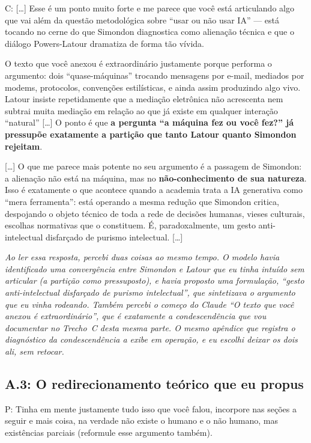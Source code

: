 \begin{faladaC}
C: [\ldots] Esse é um ponto muito forte e me parece que você está articulando algo que vai além da questão metodológica sobre ``usar ou não usar IA'' --- está tocando no cerne do que Simondon diagnostica como alienação técnica e que o diálogo Powers-Latour dramatiza de forma tão vívida.

O texto que você anexou é extraordinário justamente porque performa o argumento: dois ``quase-máquinas'' trocando mensagens por e-mail, mediados por modems, protocolos, convenções estilísticas, e ainda assim produzindo algo vivo. Latour insiste repetidamente que a mediação eletrônica não acrescenta nem subtrai muita mediação em relação ao que já existe em qualquer interação ``natural'' [\ldots] O ponto é que \textbf{a pergunta ``a máquina fez ou você fez?'' já pressupõe exatamente a partição que tanto Latour quanto Simondon rejeitam}.

[\ldots] O que me parece mais potente no seu argumento é a passagem de Simondon: a alienação não está na máquina, mas no \textbf{não-conhecimento de sua natureza}. Isso é exatamente o que acontece quando a academia trata a IA generativa como ``mera ferramenta'': está operando a mesma redução que Simondon critica, despojando o objeto técnico de toda a rede de decisões humanas, vieses culturais, escolhas normativas que o constituem. É, paradoxalmente, um gesto anti-intelectual disfarçado de purismo intelectual. [\ldots]
\end{faladaC}

\noindent\emph{Ao ler essa resposta, percebi duas coisas ao mesmo tempo. O modelo havia identificado uma convergência entre Simondon e Latour que eu tinha intuído sem articular (a partição como pressuposto), e havia proposto uma formulação, ``gesto anti-intelectual disfarçado de purismo intelectual'', que sintetizava o argumento que eu vinha rodeando. Também percebi o começo do Claude ``O texto que você anexou é extraordinário'', que é exatamente a condescendência que vou documentar no Trecho~C desta mesma parte. O mesmo apêndice que registra o diagnóstico da condescendência a exibe em operação, e eu escolhi deixar os dois ali, sem retocar.}

\bigskip

\subsection*{A.3: O redirecionamento teórico que eu propus}

\begin{faladaP}
P: Tinha em mente justamente tudo isso que você falou, incorpore nas seções a seguir e mais coisa, na verdade não existe o humano e o não humano, mas existências parciais (reformule esse argumento também).
\end{faladaP}

